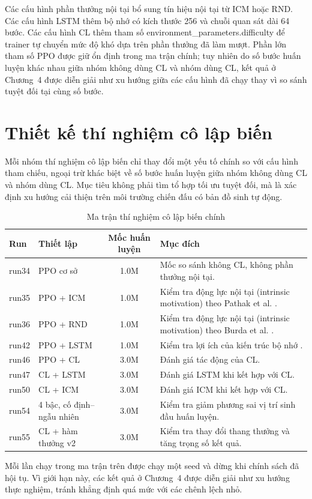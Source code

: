 Các cấu hình phần thưởng nội tại bổ sung tín hiệu nội tại từ ICM hoặc RND. Các cấu hình LSTM thêm bộ nhớ có kích thước 256 và chuỗi quan sát dài 64 bước. Các cấu hình CL thêm tham số {environment\_parameters.difficulty} để trainer tự chuyển mức độ khó dựa trên phần thưởng đã làm mượt. Phần lớn tham số PPO được giữ ổn định trong ma trận chính; tuy nhiên do số bước huấn luyện khác nhau giữa nhóm không dùng CL và nhóm dùng CL, kết quả ở Chương~4 được diễn giải như xu hướng giữa các cấu hình đã chạy thay vì so sánh tuyệt đối tại cùng số bước.

\section{Thiết kế thí nghiệm cô lập biến}

Mỗi nhóm thí nghiệm cô lập biến chỉ thay đổi một yếu tố chính so với cấu hình tham chiếu, ngoại trừ khác biệt về số bước huấn luyện giữa nhóm không dùng CL và nhóm dùng CL. Mục tiêu không phải tìm tổ hợp tối ưu tuyệt đối, mà là xác định xu hướng cải thiện trên môi trường chiến đấu có bản đồ sinh tự động.

\begin{table}[H]
    \centering
    \small
    \caption{Ma trận thí nghiệm cô lập biến chính}
    \label{tab:ablation_matrix_design}
    \begin{tabular}{|p{2cm}|p{5.1cm}|c|p{5.2cm}|}
        \hline
        \textbf{Run} & \textbf{Thiết lập} & \textbf{Mốc huấn luyện} & \textbf{Mục đích} \\
        \hline
        run34 & PPO cơ sở & 1.0M & Mốc so sánh không CL, không phần thưởng nội tại. \\
        \hline
        run35 & PPO + ICM & 1.0M & Kiểm tra động lực nội tại (intrinsic motivation) theo Pathak et al. \cite{Pathak2017}. \\
        \hline
        run36 & PPO + RND & 1.0M & Kiểm tra động lực nội tại (intrinsic motivation) theo Burda et al. \cite{Burda2018}. \\
        \hline
        run42 & PPO + LSTM & 1.0M & Kiểm tra lợi ích của kiến trúc bộ nhớ \cite{Hochreiter1997}. \\
        \hline
        run46 & PPO + CL & 3.0M & Đánh giá tác động của CL. \\
        \hline
        run47 & CL + LSTM & 3.0M & Đánh giá LSTM khi kết hợp với CL. \\
        \hline
        run50 & CL + ICM & 3.0M & Đánh giá ICM khi kết hợp với CL. \\
        \hline
        run54 & 4 bậc, cố định--ngẫu nhiên & 3.0M & Kiểm tra giảm phương sai vị trí sinh đầu huấn luyện. \\
        \hline
        run55 & CL + hàm thưởng v2 & 3.0M & Kiểm tra thay đổi thang thưởng và tăng trọng số kết quả. \\
        \hline
    \end{tabular}
\end{table}
Mỗi lần chạy trong ma trận trên được chạy một seed và dừng khi chính sách đã hội tụ. Vì giới hạn này, các kết quả ở Chương~4 được diễn giải như xu hướng thực nghiệm, tránh khẳng định quá mức với các chênh lệch nhỏ.

